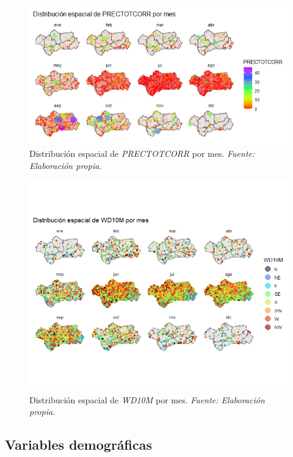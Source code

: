 \documentclass[12pt,a4paper,]{book}
\numberwithin{dummy}{section}
\theoremstyle{ocrenumbox}
\theoremstyle{blacknumex}
\theoremstyle{blacknumbox}
\theoremstyle{ocrenum}
\theoremstyle{ocrenum}
\begin{document}
\begin{figure}[H]
\centering
\includegraphics[width = \textwidth]{graficos/PRECTOTCORR_spat.png}
\caption[Distribución espacial de \textit{PRECTOTCORR} por mes]{Distribución espacial de \textit{PRECTOTCORR} por mes. \it Fuente: Elaboración propia.}
\label{fig:PRECTOTCORR_spat}
\end{figure}

\begin{figure}[H]
\centering
\includegraphics[width = \textwidth]{graficos/WD10M_spat.png}
\caption[Distribución espacial de \textit{WD10M} por mes]{Distribución espacial de \textit{WD10M} por mes. \it Fuente: Elaboración propia.}
\label{fig:WD10M_spat}
\end{figure}

\hypertarget{variables-demogruxe1ficas}{%
\subsection{Variables demográficas}\label{variables-demogruxe1ficas}}
\end{document}
